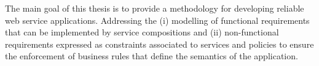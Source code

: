 
The main goal of this thesis is to provide a methodology for developing
reliable web service applications. Addressing the (i)
modelling of functional requirements that can be implemented by service
compositions and (ii) non-functional requirements expressed as constraints
associated to services and policies to ensure the enforcement of business rules
that define the semantics of the application.


